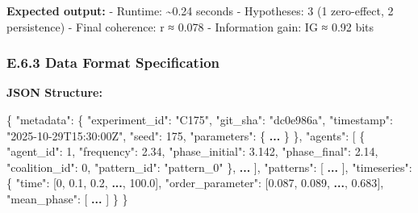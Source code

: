 \documentclass[
]{article}
\newenvironment{Shaded}{}{}
\newcommand{\DataTypeTok}[1]{\textcolor[rgb]{0.56,0.13,0.00}{#1}}
\newcommand{\DecValTok}[1]{\textcolor[rgb]{0.25,0.63,0.44}{#1}}
\newcommand{\ErrorTok}[1]{\textcolor[rgb]{1.00,0.00,0.00}{\textbf{#1}}}
\newcommand{\FloatTok}[1]{\textcolor[rgb]{0.25,0.63,0.44}{#1}}
\newcommand{\FunctionTok}[1]{\textcolor[rgb]{0.02,0.16,0.49}{#1}}
\newcommand{\OtherTok}[1]{\textcolor[rgb]{0.00,0.44,0.13}{#1}}
\newcommand{\StringTok}[1]{\textcolor[rgb]{0.25,0.44,0.63}{#1}}
\begin{document}
\textbf{Expected output:} - Runtime: \textasciitilde0.24 seconds -
Hypotheses: 3 (1 zero-effect, 2 persistence) - Final coherence: r ≈
0.078 - Information gain: IG ≈ 0.92 bits

\subsubsection{E.6.3 Data Format
Specification}\label{e.6.3-data-format-specification}

\textbf{JSON Structure:}

\begin{Shaded}
\begin{Highlighting}[]
\FunctionTok{\{}
  \DataTypeTok{"metadata"}\FunctionTok{:} \FunctionTok{\{}
    \DataTypeTok{"experiment\_id"}\FunctionTok{:} \StringTok{"C175"}\FunctionTok{,}
    \DataTypeTok{"git\_sha"}\FunctionTok{:} \StringTok{"dc0e986a"}\FunctionTok{,}
    \DataTypeTok{"timestamp"}\FunctionTok{:} \StringTok{"2025{-}10{-}29T15:30:00Z"}\FunctionTok{,}
    \DataTypeTok{"seed"}\FunctionTok{:} \DecValTok{175}\FunctionTok{,}
    \DataTypeTok{"parameters"}\FunctionTok{:} \FunctionTok{\{} \ErrorTok{...} \FunctionTok{\}}
  \FunctionTok{\},}
  \DataTypeTok{"agents"}\FunctionTok{:} \OtherTok{[}
    \FunctionTok{\{}
      \DataTypeTok{"agent\_id"}\FunctionTok{:} \DecValTok{1}\FunctionTok{,}
      \DataTypeTok{"frequency"}\FunctionTok{:} \FloatTok{2.34}\FunctionTok{,}
      \DataTypeTok{"phase\_initial"}\FunctionTok{:} \FloatTok{3.142}\FunctionTok{,}
      \DataTypeTok{"phase\_final"}\FunctionTok{:} \FloatTok{2.14}\FunctionTok{,}
      \DataTypeTok{"coalition\_id"}\FunctionTok{:} \DecValTok{0}\FunctionTok{,}
      \DataTypeTok{"pattern\_id"}\FunctionTok{:} \StringTok{"pattern\_0"}
    \FunctionTok{\}}\OtherTok{,}
    \ErrorTok{...}
  \OtherTok{]}\FunctionTok{,}
  \DataTypeTok{"patterns"}\FunctionTok{:} \OtherTok{[} \ErrorTok{...} \OtherTok{]}\FunctionTok{,}
  \DataTypeTok{"timeseries"}\FunctionTok{:} \FunctionTok{\{}
    \DataTypeTok{"time"}\FunctionTok{:} \OtherTok{[}\DecValTok{0}\OtherTok{,} \FloatTok{0.1}\OtherTok{,} \FloatTok{0.2}\OtherTok{,} \ErrorTok{...}\OtherTok{,} \FloatTok{100.0}\OtherTok{]}\FunctionTok{,}
    \DataTypeTok{"order\_parameter"}\FunctionTok{:} \OtherTok{[}\FloatTok{0.087}\OtherTok{,} \FloatTok{0.089}\OtherTok{,} \ErrorTok{...}\OtherTok{,} \FloatTok{0.683}\OtherTok{]}\FunctionTok{,}
    \DataTypeTok{"mean\_phase"}\FunctionTok{:} \OtherTok{[} \ErrorTok{...} \OtherTok{]}
  \FunctionTok{\}}
\FunctionTok{\}}
\end{Highlighting}
\end{Shaded}
\end{document}
